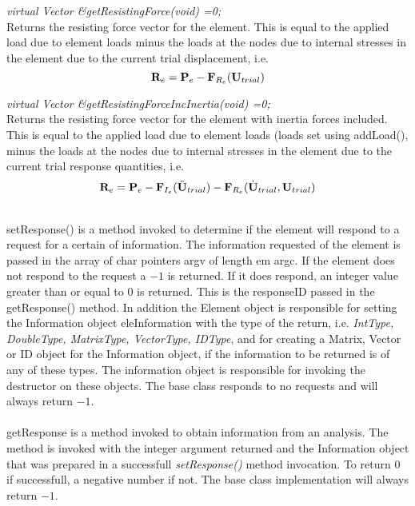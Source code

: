 {\em virtual Vector \&getResistingForce(void) =0;} \\
Returns the resisting force vector for the element. This is equal to
the applied load due to element loads minus the loads at the nodes due
to internal stresses in the element due to the current trial
displacement, i.e. 
$$
{\bf R}_e = 
{\bf P}_{e} - {\bf F}_{R_e}({\bf U}_{trial}) 
$$

{\em virtual Vector \&getResistingForceIncInertia(void) =0;} \\
Returns the resisting force vector for the element with inertia forces
included. This is equal to the applied load due to element loads
(loads set using addLoad(), minus the loads at the nodes due to
internal stresses in the element due to the current trial response
quantities, i.e.
$$
{\bf R}_e = 
{\bf P}_e -  {\bf F}_{I_e} (\ddot {{\bf U}}_{trial}) - {\bf F}_{R_e}(\dot
{{\bf U}}_{trial}, {\bf U}_{trial})
$$


\\
setResponse() is a method invoked to determine if the element
will respond to a request for a certain of information. The
information requested of the element is passed in the array of char
pointers \p argv of length {em argc}. If the element does not
respond to the request a $-1$ is returned. If it does respond, an
integer value greater than or equal to $0$ is returned. This is the
\p responseID passed in the getResponse() method. In addition
the Element object is responsible for setting the Information object
\p eleInformation with the type of the return, i.e. {\em IntType,
DoubleType, MatrixType, VectorType, IDType}, and for creating a Matrix,
Vector or ID object for the Information object, if the information to
be returned is of any of these types. The information object is
responsible for invoking the destructor on these objects. The base
class responds to no requests and will always return $-1$. \\

\\ 
getResponse is a method invoked to obtain information from an
analysis. The method is invoked with the integer argument returned and
the Information object that was prepared in a successfull {\em
setResponse()} method invocation. To return $0$ if successfull, a
negative number if not. The base class implementation will always
return $-1$. 
